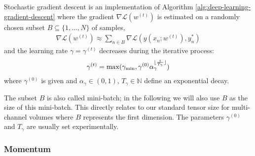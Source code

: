\begin{definition}
  \label{def:deep-learning-sgd}
  Stochastic gradient descent is an implementation of Algorithm
  \ref{alg:deep-learning-gradient-descent} where the gradient $\nabla\mathcal{L}(w^{(t)})$
  is estimated on a randomly chosen subset $B \subseteq \{1,\ldots,N\}$ of samples, \ie
  \begin{align}
    \nabla \mathcal{L}(w^{(t)}) \approx \sum_{n \in B} \nabla \mathcal{L}(y(x_n;w^{(t)}), y^*_n)
  \end{align}
  and the learning rate $\gamma = \gamma^{(t)}$ decreases during the iterative
  process:
  \begin{align}
    \gamma^{(t)} = \max(\gamma_{\min}, \gamma^{(0)} \alpha_\gamma^{\lfloor\frac{t}{T_\gamma}\rfloor})\label{eq:deep-learning-learning-rate}
  \end{align}
  where $\gamma^{(0)}$ is given and $\alpha_\gamma \in (0, 1)$,
  $T_\gamma \in \mathbb{N}$ define an exponential decay.
\end{definition}

The subset $B$ is also called mini-batch; in the following we will also
use $B$ as the size of this mini-batch. This directly relates to our standard
tensor size for multi-channel volumes where $B$ represents the first dimension.
The parameters $\gamma^{(0)}$ and $T_\gamma$ are usually set experimentally.



\subsubsection{Momentum}

